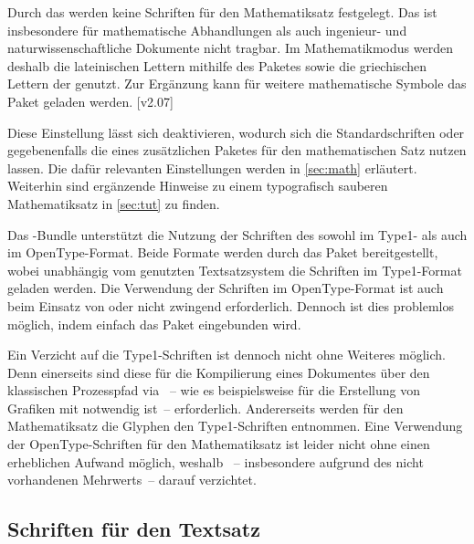 \begin{DeclareEntity*}{}
\begin{DeclareEntity*}{}
\begin{DeclareEntity*}{}
%
Durch das \CD werden keine Schriften für den Mathematiksatz festgelegt. Das ist 
insbesondere für mathematische Abhandlungen als auch ingenieur- und 
naturwissenschaftliche Dokumente nicht tragbar. Im Mathematikmodus werden 
deshalb die lateinischen Lettern mithilfe des Paketes 
sowie die griechischen Lettern der \OpenSans genutzt. Zur Ergänzung kann für 
weitere mathematische Symbole das Paket  geladen werden.
[v2.07]

Diese Einstellung lässt sich deaktivieren, wodurch sich die Standardschriften 
oder gegebenenfalls die eines zusätzlichen Paketes für den mathematischen Satz 
nutzen lassen. Die dafür relevanten Einstellungen werden in \autoref{sec:math} 
erläutert. Weiterhin sind ergänzende Hinweise zu einem typografisch sauberen
Mathematiksatz in \autoref{sec:tut} zu finden.


%
Das \TUDScript-Bundle unterstützt die Nutzung der Schriften des \CDs sowohl 
im Type1- als auch im OpenType-Format. Beide Formate werden durch das Paket 
 bereitgestellt, wobei unabhängig vom genutzten 
Textsatzsystem die Schriften im Type1-Format geladen werden. Die Verwendung der 
Schriften im OpenType-Format ist auch beim Einsatz von  oder 
 nicht zwingend erforderlich. Dennoch ist dies problemlos 
möglich, indem einfach das Paket  eingebunden wird.

Ein Verzicht auf die Type1-Schriften ist dennoch nicht ohne Weiteres möglich. 
Denn einerseits sind diese für die Kompilierung eines Dokumentes über den 
klassischen Prozesspfad via ~-- wie es 
beispielsweise für die Erstellung von Grafiken mit  notwendig 
ist~-- erforderlich. Andererseits werden für den Mathematiksatz die Glyphen den 
Type1-Schriften entnommen. Eine Verwendung der OpenType-Schriften für den 
Mathematiksatz ist leider nicht ohne einen erheblichen Aufwand möglich, weshalb 
\TUDScript~-- insbesondere aufgrund des nicht vorhandenen Mehrwerts~-- darauf 
verzichtet.



\subsection{%
  Schriften für den Textsatz%
  \label{sec:text}%
}


\end{DeclareEntity*}
\end{DeclareEntity*}
\end{DeclareEntity*}
